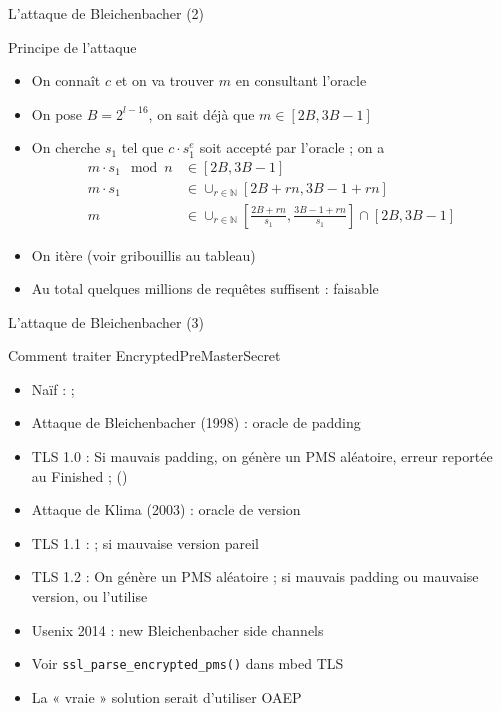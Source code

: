 \documentclass{mpg-ep-slides}
\begin{document}
\begin{frame}{L'attaque de Bleichenbacher (2)}
  \begin{block}{Principe de l'attaque}
    \begin{itemize}
      \item On connaît $c$ et on va trouver $m$ en consultant l'oracle
      \item On pose $B = 2^{l-16}$, on sait déjà que $m \in [2B, 3B-1]$
      \item On cherche $s_1$ tel que $c \cdot s_1^e$ soit
        accepté par l'oracle ; on a
        \begin{align}
          m \cdot s_1 \mod n
          & \in [2B, 3B-1]
          \\ m \cdot s_1
          & \in \cup_{r \in \mathbb N} [2B + rn, 3B-1 + rn]
          \\ m
          & \in \cup_{r \in \mathbb N}
          \left[ \frac{2B + rn}{s_1}, \frac{3B-1 + rn}{s_1} \right]
          \cap [2B, 3B-1]
        \end{align}
      \item On itère (voir gribouillis au tableau)
      \item Au total quelques millions de requêtes suffisent : faisable
    \end{itemize}
  \end{block}
\end{frame}

\begin{frame}{L'attaque de Bleichenbacher (3)}
  \begin{block}{Comment traiter EncryptedPreMasterSecret}
    \begin{itemize}
      \item Naïf :  ;
      \item<2-> Attaque de Bleichenbacher (1998) : oracle de padding
      \item<2-> TLS 1.0 : Si mauvais padding, on génère un PMS aléatoire,
        erreur reportée au Finished ; ()
      \item<3-> Attaque de Klima (2003) : oracle de version
      \item<3-> TLS 1.1 :  ; si mauvaise version pareil
      \item<4-> TLS 1.2 : On génère un PMS aléatoire ; si mauvais padding ou
        mauvaise version, ou l'utilise
      \item<4-> Usenix 2014 : new Bleichenbacher side channels
      \item<4-> Voir \texttt{ssl\_parse\_encrypted\_pms()} dans mbed TLS
      \item<5-> La « vraie » solution serait d'utiliser OAEP
    \end{itemize}
  \end{block}
\end{frame}
\end{document}
